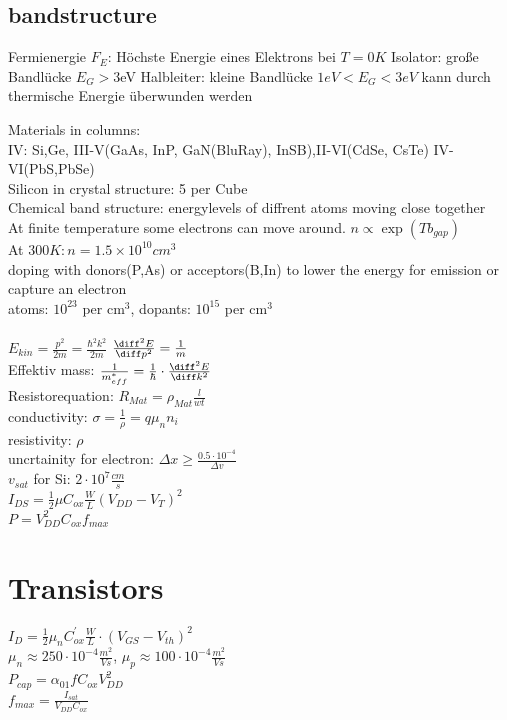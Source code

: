 \documentclass[fs, footer]{latex4ei}
\begin{document}
\begin{multicols}{4}
		\subsection{bandstructure}
	Fermienergie $F_E$: Höchste Energie eines Elektrons bei $T = 0K$
	Isolator: große Bandlücke $E_G > 3$eV
	Halbleiter: kleine Bandlücke $1 eV < E_G < 3eV$ kann durch thermische Energie überwunden werden		
	
	
	
	Materials in columns: \\ IV: Si,Ge, III-V(GaAs, InP, GaN(BluRay), InSB),II-VI(CdSe, CsTe) IV-VI(PbS,PbSe)\\
	Silicon in crystal structure: 5 per Cube\\
	Chemical band structure: energylevels of diffrent atoms moving close together\\
	At finite temperature some electrons can move around. $n \propto \exp(T b_{gap})$\\
	At $300K:n = 1.5 \times 10^10 cm^3$\\
	doping with donors(P,As) or acceptors(B,In) to lower the energy for emission or capture an electron\\
	atoms: $10^23$ per cm$^3$, dopants: $10^15$ per cm$^3$\\
	\\
	$E_{kin} = \frac{p^2}{2m} = \frac{\hbar^2 k^2}{2m}$ \qquad  $\frac{\diff^2 E}{\diff p^2} = \frac{1}{m}$\\
	Effektiv mass: $\frac{1}{m^*_{eff}} = \frac{1}{\hbar} \cdot \frac{\diff^2 E}{\diff k^2}$\\
	
	
	Resistorequation: $R_{Mat} = \rho_{Mat} \frac{l}{wt}$\\
	conductivity: $\sigma = \frac{1}{\rho} = q \mu_n n_i$\\
	resistivity: $\rho$\\
	
	uncrtainity for electron: $\Delta x \ge \frac{0.5 \cdot 10^{-4}}{\Delta v}$\\
	
	
	$v_{sat}$ for Si: $2 \cdot 10^7 \frac{cm}{s}$\\
	$I_{DS} = \frac{1}{2} \mu C_{ox} \frac{W}{L} (V_{DD} - V_T)^2$\\
	$P = V^2_{DD} C_{ox} f_{max}$\\
	
	
\section{Transistors}
$I_D = \frac{1}{2} \mu_n C^{'}_{ox} \frac{W}{L} \cdot (V_{GS} - V_{th})^2$\\
$\mu_n \approx 250 \cdot 10^{-4} \frac{m^2}{Vs}$, $\mu_p \approx 100 \cdot 10^{-4} \frac{m^2}{Vs}$\\
$P_{cap} = \alpha_{01} f C_{ox} V_{DD}^2$\\
$f_{max} = \frac{I_{sat}}{V_{DD} C_{ox}}$


\end{multicols}
\end{document}
